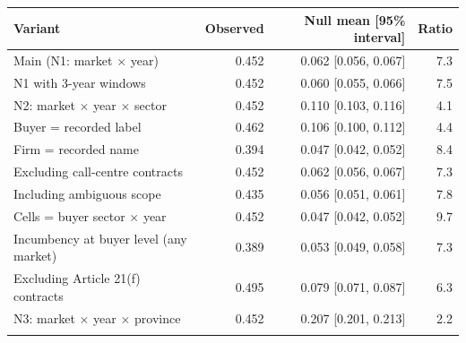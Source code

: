 \begin{tabular}{@{}lrrr@{}}
\toprule
Variant & Observed & Null mean [95\% interval] & Ratio\\
\midrule
Main (N1: market $\times$ year) & 0.452 & 0.062 [0.056, 0.067] & 7.3\\
N1 with 3-year windows & 0.452 & 0.060 [0.055, 0.066] & 7.5\\
N2: market $\times$ year $\times$ sector & 0.452 & 0.110 [0.103, 0.116] & 4.1\\
Buyer = recorded label & 0.462 & 0.106 [0.100, 0.112] & 4.4\\
Firm = recorded name & 0.394 & 0.047 [0.042, 0.052] & 8.4\\
Excluding call-centre contracts & 0.452 & 0.062 [0.056, 0.067] & 7.3\\
Including ambiguous scope & 0.435 & 0.056 [0.051, 0.061] & 7.8\\
Cells = buyer sector $\times$ year & 0.452 & 0.047 [0.042, 0.052] & 9.7\\
Incumbency at buyer level (any market) & 0.389 & 0.053 [0.049, 0.058] & 7.3\\
Excluding Article 21(f) contracts & 0.495 & 0.079 [0.071, 0.087] & 6.3\\
N3: market $\times$ year $\times$ province & 0.452 & 0.207 [0.201, 0.213] & 2.2\\
\botrule
\end{tabular}